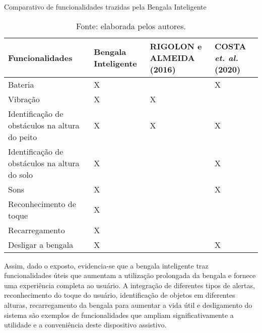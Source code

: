         \begin{table}[!ht]    
            \captionsetup{width=1.0\textwidth} %
            \caption{Comparativo de funcionalidades trazidas pela Bengala Inteligente}    
            \begin{tabular}{p{}p{}p{}p{}} %

                \toprule
                Funcionalidades & Bengala Inteligente & RIGOLON e ALMEIDA (2016) & COSTA \textit{et. al.} (2020)  \\
                \midrule
                Bateria                                                 & X  &    & X  \\
                Vibração                                                & X  &  X &    \\
                Identificação de obstáculos na altura do peito          & X  &  X & X  \\
                Identificação de obstáculos na altura do solo           & X  &    & X  \\
                Sons                                                    & X  &    & X  \\
                Reconhecimento de toque                                 & X  &    &    \\
                Recarregamento                                          & X  &    &    \\
                Desligar a bengala                                      & X  &    & X  \\
                \bottomrule
            \end{tabular}
            \caption*{Fonte: elaborada pelos autores.} %
            \label{tab:comparativo_funcionalidades}

        \end{table}
    Assim, dado o exposto, evidencia-se que a bengala inteligente traz funcionalidades úteis que aumentam a utilização prolongada da bengala e fornece uma experiência completa ao usuário. A integração de diferentes tipos de alertas, reconhecimento do toque do usuário, identificação de objetos em diferentes alturas, recarregamento da bengala para aumentar a vida útil e desligamento do sistema são exemplos de funcionalidades que ampliam significativamente a utilidade e a conveniência deste dispositivo assistivo.

    

